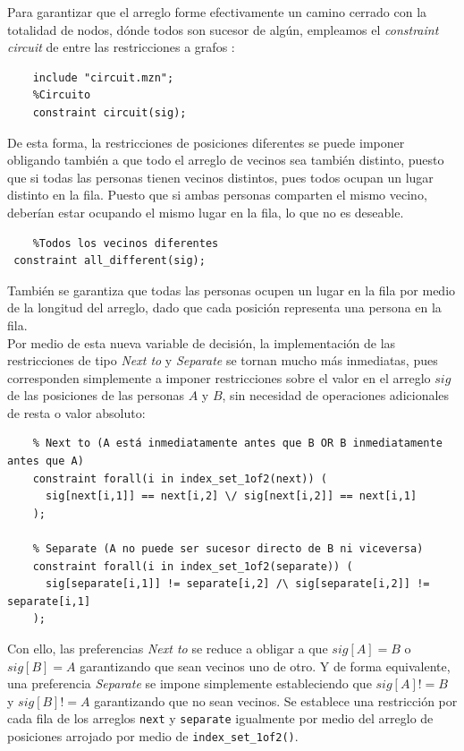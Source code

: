 Para garantizar que el arreglo forme efectivamente un camino cerrado con la totalidad de nodos, dónde todos son sucesor de algún, empleamos el \textit{constraint circuit} de entre las restricciones a grafos \cite{Stuckey2020b}:
\begin{verbatim}
    include "circuit.mzn";
    %Circuito
    constraint circuit(sig);
\end{verbatim}

De esta forma, la restricciones de posiciones diferentes se puede imponer obligando también a que todo el arreglo de vecinos sea también distinto, puesto que si todas las personas tienen vecinos distintos, pues todos ocupan un lugar distinto en la fila. Puesto que si ambas personas comparten el mismo vecino, deberían estar ocupando el mismo lugar en la fila, lo que no es deseable.\\
\begin{verbatim}
    %Todos los vecinos diferentes
 constraint all_different(sig);
\end{verbatim}
También se garantiza que todas las personas ocupen un lugar en la fila por medio de la longitud del arreglo, dado que cada posición representa una persona en la fila.\\

Por medio de esta nueva variable de decisión, la implementación de las restricciones de tipo \textit{Next to} y \textit{Separate} se tornan mucho más inmediatas, pues corresponden simplemente a imponer restricciones sobre el valor en el arreglo $sig$ de las posiciones de las personas $A$ y $B$, sin necesidad de operaciones adicionales de resta o valor absoluto:
\begin{verbatim}
    % Next to (A está inmediatamente antes que B OR B inmediatamente antes que A)
    constraint forall(i in index_set_1of2(next)) (
      sig[next[i,1]] == next[i,2] \/ sig[next[i,2]] == next[i,1]
    );
    
    % Separate (A no puede ser sucesor directo de B ni viceversa)
    constraint forall(i in index_set_1of2(separate)) (
      sig[separate[i,1]] != separate[i,2] /\ sig[separate[i,2]] != separate[i,1]
    );
\end{verbatim}
Con ello, las preferencias \textit{Next to} se reduce a obligar a que $sig[A]=B$ o $sig[B]=A$ garantizando que sean vecinos uno de otro. Y de forma equivalente, una preferencia \textit{Separate} se impone simplemente estableciendo que $sig[A]!=B$ y $sig[B]!=A$ garantizando que no sean vecinos. Se establece una restricción por cada fila de los arreglos \verb|next| y \verb|separate| igualmente por medio del arreglo de posiciones arrojado por medio de \verb|index_set_1of2()|.\\

